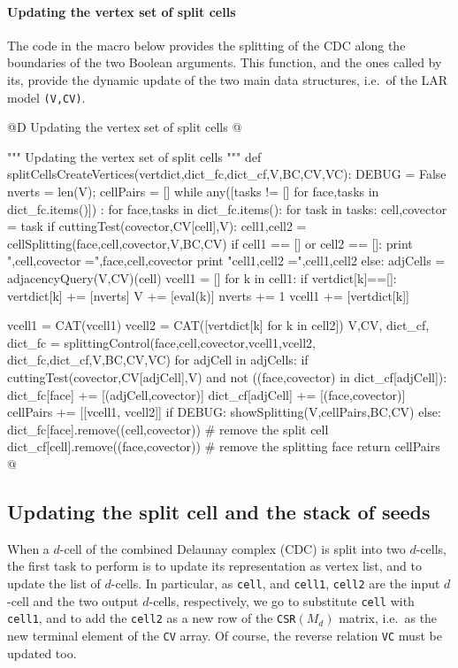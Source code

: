 \documentclass[11pt,oneside]{article}	%
\begin{document}
\paragraph{Updating the vertex set of split cells}
The code in the macro below provides the splitting of the CDC along the boundaries of the two Boolean arguments.
This function, and the ones called by its, provide the dynamic update of the two main data structures, i.e.~of the LAR model \texttt{(V,CV)}.

@D Updating the vertex set  of split cells
@{""" Updating the vertex set of split cells """
def splitCellsCreateVertices(vertdict,dict_fc,dict_cf,V,BC,CV,VC):
	DEBUG = False
	nverts = len(V); cellPairs = []
	while any([tasks != [] for face,tasks in dict_fc.items()]) : 
		for face,tasks in dict_fc.items():
			for task in tasks:
				cell,covector = task
				if cuttingTest(covector,CV[cell],V):
					cell1,cell2 = cellSplitting(face,cell,covector,V,BC,CV)
					if cell1 == [] or cell2 == []:
						print "\nface,cell,covector =",face,cell,covector
						print "cell1,cell2 =",cell1,cell2
					else:
						adjCells = adjacencyQuery(V,CV)(cell)
						vcell1 = []
						for k in cell1:
							if vertdict[k]==[]: 
								vertdict[k] += [nverts]
								V += [eval(k)]
								nverts += 1
							vcell1 += [vertdict[k]]
						
						vcell1 = CAT(vcell1)
						vcell2 = CAT([vertdict[k] for k in cell2])						
						V,CV, dict_cf, dict_fc = splittingControl(face,cell,covector,vcell1,vcell2, 
														dict_fc,dict_cf,V,BC,CV,VC)
						for adjCell in adjCells:
							if cuttingTest(covector,CV[adjCell],V) and not ((face,covector) in dict_cf[adjCell]):
								dict_fc[face] += [(adjCell,covector)] 
								dict_cf[adjCell] += [(face,covector)] 
						cellPairs += [[vcell1, vcell2]]
					if DEBUG: showSplitting(V,cellPairs,BC,CV)
				else:
					dict_fc[face].remove((cell,covector))   # remove the split cell
					dict_cf[cell].remove((face,covector))   # remove the splitting face
	return cellPairs
@}


\subsection{Updating the split cell and the stack of seeds}

When a $d$-cell of the combined Delaunay complex (CDC) is split into two $d$-cells, the first task to perform is to update its representation as vertex list, and to update the list of $d$-cells. In particular, as \texttt{cell}, and \texttt{cell1}, \texttt{cell2} are the input $d$-cell and the two output $d$-cells, respectively, we go to substitute \texttt{cell} with \texttt{cell1}, and to add the \texttt{cell2} as a new row of the \texttt{CSR}$(M_d)$ matrix, i.e.~as the new terminal element of the \texttt{CV} array. Of course, the reverse relation \texttt{VC} must be updated too.
\end{document}

